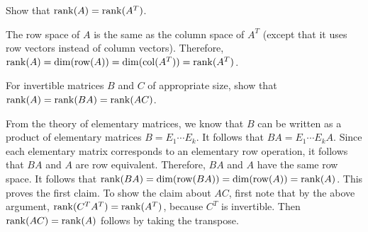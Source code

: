 \begin{ex}
  Show that $\rank(A)=\rank(A^T)$.
  \begin{sol}
    The row space of $A$ is the same as the column space of $A^T$
    (except that it uses row vectors instead of column
    vectors). Therefore, $\rank(A) = \dim(\row(A)) = \dim(\col(A^T)) =
    \rank(A^T)$.
  \end{sol}
\end{ex}

\begin{ex}
  For invertible matrices $B$ and $C$ of appropriate size, show that
  $\rank(A) = \rank(BA) = \rank(AC)$.
  \begin{sol}
    From the theory of elementary matrices, we know that $B$ can be
    written as a product of elementary matrices $B=E_1\cdots E_k$.  It
    follows that $BA = E_1\cdots E_kA$. Since each elementary matrix
    corresponds to an elementary row operation, it follows that $BA$
    and $A$ are row equivalent. Therefore, $BA$ and $A$ have the same
    row space. It follows that
    $\rank(BA) = \dim(\row(BA)) = \dim(\row(A)) = \rank(A)$. This
    proves the first claim. To show the claim about $AC$, first note
    that by the above argument, $\rank(C^TA^T) = \rank(A^T)$, because
    $C^T$ is invertible. Then $\rank(AC)=\rank(A)$ follows by taking
    the transpose.
  \end{sol}
\end{ex}

